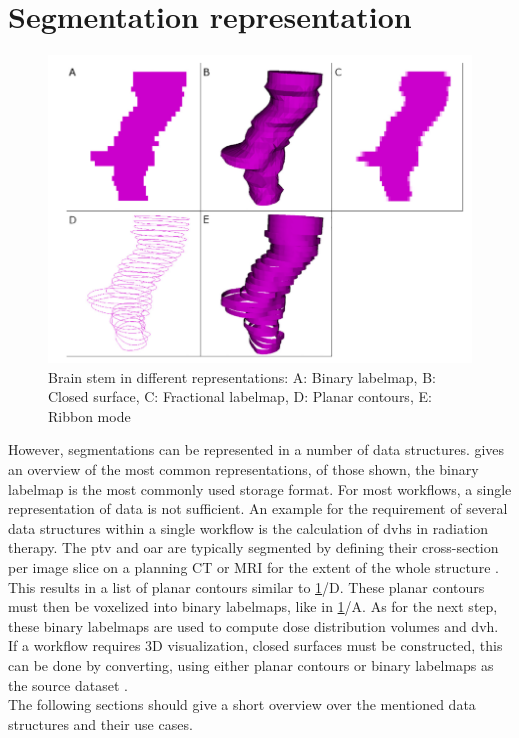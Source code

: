 \section{Segmentation representation}
\begin{figure}[h]
	\centerline{
		\includegraphics[scale=0.5]{images/segRep.png}}
	\caption{Brain stem in different representations: A: Binary labelmap, B: Closed surface, C: Fractional labelmap, D: Planar contours, E: Ribbon mode \cite{pinterPolymorphSegmentationRepresentation2019}}\label{fig:segRep}
\end{figure}

\noindent
However, segmentations can be represented in a number of data structures.
 gives an overview of the most common representations, of those shown, the binary labelmap is the most commonly used storage format.
For most workflows, a single representation of data is not sufficient.
An example for the requirement of several data structures within a single workflow is the calculation of \acrfull{dvh}s in radiation therapy.
The \acrfull{ptv} and \acrfull{oar} are typically segmented by defining their cross-section per
image slice on a planning CT or MRI for the extent of the whole structure \cite{burnetDefiningTumourTarget2004}.
This results in a list of planar contours similar to \cref{fig:segRep}/D.
These planar contours must then be voxelized into binary labelmaps, like in \cref{fig:segRep}/A.
As for the next step, these binary labelmaps are used to compute dose distribution volumes and \acrlong{dvh}.
If a workflow requires 3D visualization, closed surfaces must be constructed, this can be done by converting,
using either planar contours or binary labelmaps as the source dataset \cite{pinterPolymorphSegmentationRepresentation2019}.\\
The following sections should give a short overview over the mentioned data structures and their use cases.

